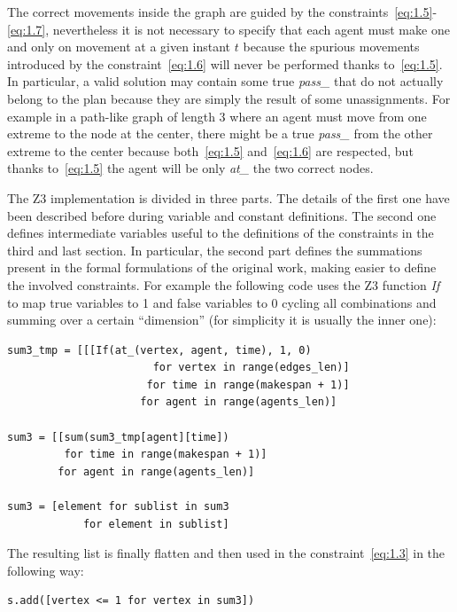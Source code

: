 \documentclass[12pt, a4paper, hidelinks]{article}
\numberwithin{equation}{section}
\begin{document}
The correct movements inside the graph are guided by the constraints~\ref{eq:1.5}-\ref{eq:1.7}, nevertheless it is not necessary to specify that each agent must make one and only on movement at a given instant $t$ because the spurious movements introduced by the constraint~\ref{eq:1.6} will never be performed thanks to~\ref{eq:1.5}.
In particular, a valid solution may contain some true \textit{pass\_} that do not actually belong to the plan because they are simply the result of some unassignments.
For example in a path-like graph of length 3 where an agent must move from one extreme to the node at the center, there might be a true \textit{pass\_} from the other extreme to the center because both~\ref{eq:1.5} and~\ref{eq:1.6} are respected, but thanks to~\ref{eq:1.5} the agent will be only \textit{at\_} the two correct nodes.

The Z3 implementation is divided in three parts.
The details of the first one have been described before during variable and constant definitions. 
The second one defines intermediate variables useful to the definitions of the constraints in the third and last section.
In particular, the second part defines the summations present in the formal formulations of the original work, making easier to define the involved constraints.
For example the following code uses the Z3 function \textit{If} to map true variables to 1 and false variables to 0 cycling all combinations and summing over a certain ``dimension'' (for simplicity it is usually the inner one):

\begin{lstlisting}[label={lst:1.3.1}]
sum3_tmp = [[[If(at_(vertex, agent, time), 1, 0)
                       for vertex in range(edges_len)]
                      for time in range(makespan + 1)]
                     for agent in range(agents_len)]

sum3 = [[sum(sum3_tmp[agent][time])
         for time in range(makespan + 1)]
        for agent in range(agents_len)]

sum3 = [element for sublist in sum3 
            for element in sublist]
\end{lstlisting}

The resulting list is finally flatten and then used in the constraint~\ref{eq:1.3} in the following way:

\begin{lstlisting}[label={lst:1.3.2}]
s.add([vertex <= 1 for vertex in sum3])
\end{lstlisting}
\end{document}
